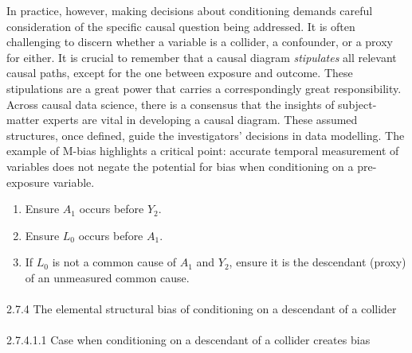 \documentclass[
  singlecolumn]{article}
\makeatletter
\let\oldparagraph\paragraph
\renewcommand{\paragraph}{
    \@ifstar
      \xxxParagraphStar
      \xxxParagraphNoStar
  }
\newcommand{\xxxParagraphStar}[1]{\oldparagraph*{#1}\mbox{}}
\newcommand{\xxxParagraphNoStar}[1]{\oldparagraph{#1}\mbox{}}
\providecommand{\tightlist}{%
  \setlength{\itemsep}{0pt}\setlength{\parskip}{0pt}}\usepackage{longtable,booktabs,array}
\makeatother
\begin{document}
In practice, however, making decisions about conditioning demands
careful consideration of the specific causal question being addressed.
It is often challenging to discern whether a variable is a collider, a
confounder, or a proxy for either. It is crucial to remember that a
causal diagram \emph{stipulates} all relevant causal paths, except for
the one between exposure and outcome. These stipulations are a great
power that carries a correspondingly great responsibility. Across causal
data science, there is a consensus that the insights of subject-matter
experts are vital in developing a causal diagram. These assumed
structures, once defined, guide the investigators' decisions in data
modelling. The example of M-bias highlights a critical point: accurate
temporal measurement of variables does not negate the potential for bias
when conditioning on a pre-exposure variable.

\begin{enumerate}
\def\labelenumi{\arabic{enumi}.}
\tightlist
\item
  Ensure \(A_1\) occurs before \(Y_2\).
\item
  Ensure \(L_0\) occurs before \(A_1\).
\item
  If \(L_0\) is not a common cause of \(A_1\) and \(Y_2\), ensure it is
  the descendant (proxy) of an unmeasured common cause.
\end{enumerate}

\paragraph{2.7.4 The elemental structural bias of conditioning on a
descendant of a
collider}\label{the-elemental-structural-bias-of-conditioning-on-a-descendant-of-a-collider}

\paragraph{2.7.4.1.1 Case when conditioning on a descendant of a
collider creates
bias}\label{case-when-conditioning-on-a-descendant-of-a-collider-creates-bias}
\end{document}
